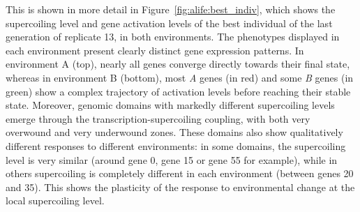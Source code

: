 This is shown in more detail in Figure~\ref{fig:alife:best_indiv}, which shows the supercoiling level and gene activation levels of the best individual of the last generation of replicate 13, in both environments.
The phenotypes displayed in each environment present clearly distinct gene expression patterns.
In environment A (top), nearly all genes converge directly towards their final state, whereas in environment B (bottom), most \emph{A} genes (in red) and some \emph{B} genes (in green) show a complex trajectory of activation levels before reaching their stable state.
Moreover, genomic domains with markedly different supercoiling levels emerge through the transcription-supercoiling coupling, with both very overwound and very underwound zones.
These domains also show qualitatively different responses to different environments: in some domains, the supercoiling level is very similar (around gene 0, gene 15 or gene 55 for example), while in others supercoiling is completely different in each environment (between genes 20 and 35).
This shows the plasticity of the response to environmental change at the local supercoiling level.

